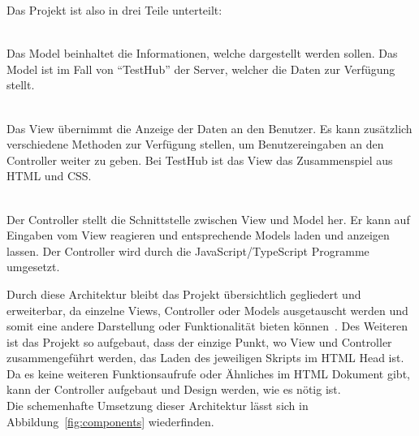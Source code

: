 Das Projekt ist also in drei Teile unterteilt:
\begin{description}
    \hfill\\
    Das Model beinhaltet die Informationen, welche dargestellt werden sollen. Das
    Model ist im Fall von ``TestHub'' der Server, welcher die Daten zur Verfügung stellt.

    \hfill\\
    Das View übernimmt die Anzeige der Daten an den Benutzer. Es kann zusätzlich
    verschiedene Methoden zur Verfügung stellen, um Benutzereingaben an den Controller
    weiter zu geben. Bei TestHub ist das View das Zusammenspiel aus \gls{HTML} und \gls{CSS}.

    \hfill\\
    Der Controller stellt die Schnittstelle zwischen View und Model her. Er kann 
    auf Eingaben vom View reagieren und entsprechende Models laden und anzeigen lassen.
    Der Controller wird durch die JavaScript/TypeScript Programme umgesetzt.
\end{description}

Durch diese Architektur bleibt das Projekt übersichtlich gegliedert und erweiterbar, 
da einzelne Views, Controller oder Models ausgetauscht werden und somit eine andere 
Darstellung oder Funktionalität bieten können~\cite{Aug20}. Des Weiteren ist das Projekt so 
aufgebaut, dass der einzige Punkt, wo View und Controller zusammengeführt werden,
das Laden des jeweiligen Skripts im \gls{HTML} Head ist. Da es keine weiteren 
Funktionsaufrufe oder Ähnliches im \gls{HTML} Dokument gibt, kann der Controller
aufgebaut und Design werden, wie es nötig ist. \\

Die schemenhafte Umsetzung dieser Architektur lässt sich in Abbildung~\ref{fig:components}
wiederfinden.

\newpage